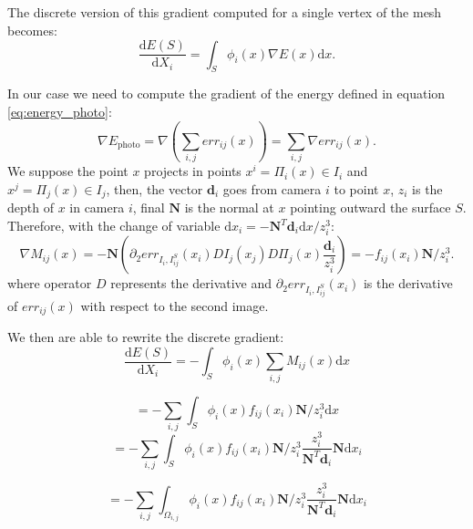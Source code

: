 The discrete version of this gradient computed for a single vertex of the mesh becomes:
\begin{equation}
  \frac{\textrm{d}E(\mathit{S})}{\textrm{d}X_i} =  \int_{\mathit{S}} \phi_i(x) \nabla E(x) \textrm{d}x.
\end{equation}

In our case we need to compute the gradient of the energy defined in equation \eqref{eq:energy_photo}:
\begin{equation}
  \nabla E_{\textrm{photo}} = \nabla (\sum_{i,j} err_{ij}(x)) = \sum_{i,j} \nabla err_{ij}(x).
\end{equation}
We suppose the point $x$ projects in points $x^i = \Pi_i(x) \in I_i$ and  $x^j = \Pi_j(x) \in I_j$, then, the vector $\mathbf{d}_i$ goes from camera $i$ to point $x$, $z_i$ is the depth of $x$ in camera $i$, final $\mathbf{N}$ is the normal at $x$ pointing outward the surface $\mathit{S}$. 
Therefore, with the change of variable $\textrm{d}x_i = -\mathbf{N}^T \mathbf{d}_i \textrm{d}x/z_i^3$:
\begin{equation}
  \nabla \mathit{M}_{ij}(x) = -\mathbf{N} \left( \partial_2 err_{I_i, I_{ij}^{\mathit{S}}}(x_i) DI_j(x_j) D\Pi_j(x)\frac{\mathbf{d}_i}{z_i^3}\right) = - f_{ij}(x_i) \mathbf{N}/z_i^3.
\end{equation}
where operator $D$ represents the derivative and $\partial_2 err_{I_i, I_{ij}^{\mathit{S}}}(x_i)$ is the derivative of $err_{ij}(x)$ with respect to the second image.


We then are able to rewrite the discrete gradient:
\begin{equation}
  \frac{\textrm{d}E(\mathit{S})}{\textrm{d}X_i} =  - \int_{\mathit{S}} \phi_i(x) \sum_{i,j} \mathit{M}_{ij}(x) \textrm{d}x 
\end{equation}

\begin{equation}
  =  - \sum_{i,j} \int_{\mathit{S}} \phi_i(x)  f_{ij}(x_i)  \mathbf{N}/z_i^3 \textrm{d}x 
\end{equation}
\begin{equation}
  =  - \sum_{i,j} \int_{\mathit{S}} \phi_i(x)  f_{ij}(x_i)  \mathbf{N}/z_i^3 \frac{z_i^3}{\mathbf{N}^T \mathbf{d}_i }\mathbf{N} \textrm{d}x_i
\end{equation}

\begin{equation}
\label{eq:final}
  =  - \sum_{i,j} \int_{\mathit{\Omega_{i,j}}} \phi_i(x)  f_{ij}(x_i)  \mathbf{N}/z_i^3 \frac{z_i^3}{\mathbf{N}^T \mathbf{d}_i }\mathbf{N} \textrm{d}x_i
\end{equation}

